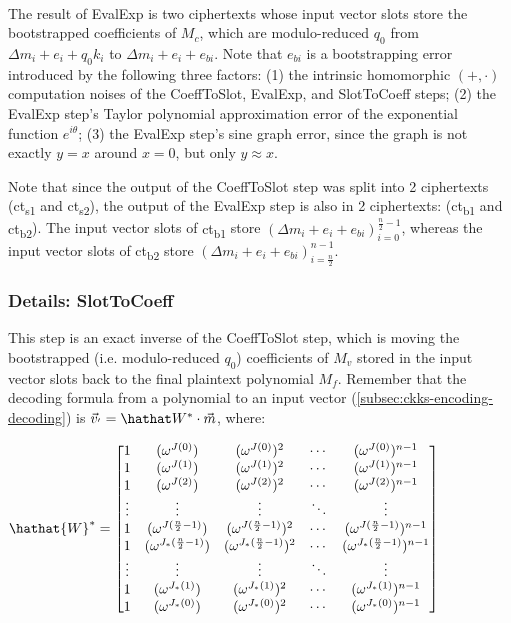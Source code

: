 $ $

The result of \textsf{EvalExp} is two ciphertexts whose input vector slots store the bootstrapped coefficients of $M_c$, which are modulo-reduced $q_0$ from $\Delta m_i + e_i + q_0k_i$ to $\Delta m_i + e_i + e_{bi}$. Note that $e_{bi}$ is a bootstrapping error introduced by the following three factors: (1) the intrinsic homomorphic $(+, \cdot)$ computation noises of the \textsf{CoeffToSlot}, \textsf{EvalExp}, and \textsf{SlotToCoeff} steps; (2) the \textsf{EvalExp} step's Taylor polynomial approximation error of the exponential function $e^{i\theta}$; (3) the \textsf{EvalExp} step's sine graph error, since the graph is not exactly $y=x$ around $x=0$, but only $y \approx x$.

Note that since the output of the \textsf{CoeffToSlot} step was split into 2 ciphertexts (\textsf{ct\textsubscript{s1}} and \textsf{ct\textsubscript{s2}}), the output of the \textsf{EvalExp} step is also in 2 ciphertexts: (\textsf{ct\textsubscript{b1}} and \textsf{ct\textsubscript{b2}}). The input vector slots of \textsf{ct\textsubscript{b1}} store $(\Delta m_i + e_i + e_{bi})_{i=0}^{\frac{n}{2} - 1}$, whereas the input vector slots of \textsf{ct\textsubscript{b2}} store $(\Delta m_i + e_i + e_{bi})_{i=\frac{n}{2}}^{n - 1}$.


\subsubsection{Details: \textsf{SlotToCoeff}}
\label{subsubsec:ckks-bootstrapping-slottocoeff-details}

This step is an exact inverse of the \textsf{CoeffToSlot} step, which is moving the bootstrapped (i.e. modulo-reduced $q_0$) coefficients of $M_v$ stored in the input vector slots back to the final plaintext polynomial $M_f$. Remember that the decoding formula from a polynomial to an input vector (\autoref{subsec:ckks-encoding-decoding}) is $\vec{v}_{'} = \hathat W^* \cdot \vec{m}$, where:




$\hathat{W}^* = \begin{bmatrix}
1 & (\omega^{J(0)}) & (\omega^{J(0)})^2 & \cdots & (\omega^{J(0)})^{n-1}\\
1 & (\omega^{J(1)}) & (\omega^{J(1)})^2 & \cdots & (\omega^{J(1)})^{n-1}\\
1 & (\omega^{J(2)}) & (\omega^{J(2)})^2 & \cdots & (\omega^{J(2)})^{n-1}\\
\vdots & \vdots & \vdots & \ddots & \vdots \\
1 & (\omega^{J(\frac{n}{2}-1)}) & (\omega^{J(\frac{n}{2}-1)})^2 & \cdots & (\omega^{J(\frac{n}{2}-1)})^{n-1}\\
1 & (\omega^{J_*(\frac{n}{2}-1)}) & (\omega^{J_*(\frac{n}{2}-1)})^2 & \cdots & (\omega^{J_*(\frac{n}{2}-1)})^{n-1}\\
\vdots & \vdots & \vdots & \ddots & \vdots \\
1 & (\omega^{J_*(1)}) & (\omega^{J_*(1)})^2 & \cdots & (\omega^{J_*(1)})^{n-1}\\
1 & (\omega^{J_*(0)}) & (\omega^{J_*(0)})^2 & \cdots & (\omega^{J_*(0)})^{n-1}\\
\end{bmatrix}$

